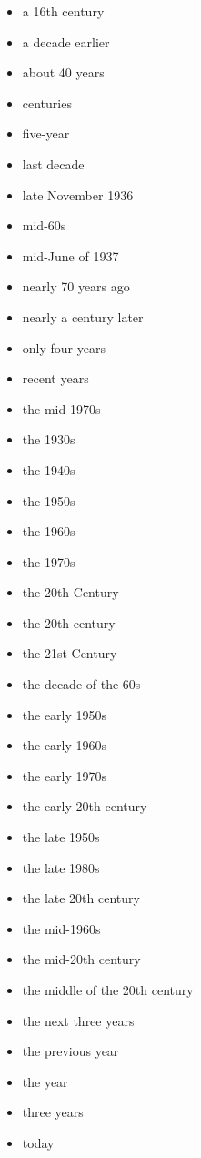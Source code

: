 \documentclass[12pt,a4paper]{article}
\begin{document}
\begin{itemize}
  \item a 16th century
  \item a decade earlier
  \item about 40 years
  \item centuries
  \item five-year
  \item last decade
  \item late November 1936
  \item mid-60s
  \item mid-June of 1937
  \item nearly 70 years ago
  \item nearly a century later
  \item only four years
  \item recent years
  \item the mid-1970s
  \item the 1930s
  \item the 1940s
  \item the 1950s
  \item the 1960s
  \item the 1970s
  \item the 20th Century
  \item the 20th century
  \item the 21st Century
  \item the decade of the 60s
  \item the early 1950s
  \item the early 1960s
  \item the early 1970s
  \item the early 20th century
  \item the late 1950s
  \item the late 1980s
  \item the late 20th century
  \item the mid-1960s
  \item the mid-20th century
  \item the middle of the 20th century
  \item the next three years
  \item the previous year
  \item the year
  \item three years
  \item today
\end{itemize}
\end{document}

